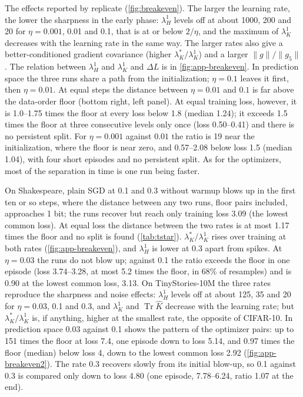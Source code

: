 \documentclass[10pt]{article}
\makeatletter
\renewcommand\paragraph{\@startsection{paragraph}{4}{\z@}{1.2ex \@plus .4ex \@minus .2ex}{-1em}{\normalfont\normalsize\bfseries}}
\newcommand{\extra}{\textsuperscript{\dag}}  %
\makeatother
\begin{document}
\paragraph{CIFAR-10.} The effects reported by \citet{jastrzebski2020breakeven} replicate
(\cref{fig:breakeven}). The larger the learning rate, the lower the sharpness in the early phase:
$\lambda_H^1$ levels off at about 1000, 200 and 20 for $\eta=0.001$, 0.01 and 0.1, that is at or below $2/\eta$,
and the maximum of $\lambda_K^1$ decreases with the learning rate in the same way. The larger rates also give a better-conditioned gradient covariance
(higher $\lambda_K^\ast/\lambda_K^1$) and a larger $\|g\|/\|g_5\|$. The relation between $\lambda_H^1$ and
$\lambda_K^1$ and $\Delta L$ is in \cref{fig:app-breakeven}. In prediction space the three runs share a path
from the initialization; $\eta=0.1$ leaves it first, then $\eta=0.01$. At equal steps the distance between
$\eta=0.01$ and $0.1$ is far above the data-order floor (bottom right, left panel). At equal training loss,
however, it is 1.0--1.75 times the floor at every loss below 1.8 (median 1.24); it exceeds 1.5 times the floor
at three consecutive levels only once (loss 0.50--0.41) and there is no persistent split. For $\eta=0.001$
against $0.01$ the ratio is 19 near the initialization, where the floor is near zero, and 0.57--2.08 below loss
1.5 (median 1.04), with four short episodes and no persistent split. As for the optimizers, most of the
separation in time is one run being faster.

\paragraph{Language models.\extra} On Shakespeare, plain SGD at 0.1 and 0.3 without warmup blows up in the first
ten or so steps, where the distance between any two runs, floor pairs included, approaches 1 bit; the runs
recover but reach only training loss 3.09 (the lowest common loss). At equal loss the distance between the two
rates is at most 1.17 times the floor and no split is found (\cref{tab:tstar}).
$\lambda_K^\ast/\lambda_K^1$ rises over training at both rates (\cref{fig:app-breakeven}), and $\lambda_H^1$ is lower at 0.3 apart from
spikes. At $\eta=0.03$ the runs do not blow up; against 0.1 the ratio exceeds the floor in one episode (loss
3.74--3.28, at most 5.2 times the floor, in 68\% of resamples) and is 0.90 at the lowest common loss, 3.13. On
TinyStories-10M the three rates reproduce the sharpness and noise effects: $\lambda_H^1$ levels off at about 125,
35 and 20 for $\eta=0.03$, 0.1 and 0.3, and $\lambda_K^1$ and $\operatorname{Tr}\hat K$ decrease with the
learning rate; but $\lambda_K^\ast/\lambda_K^1$ is, if anything, higher at the smallest rate, the opposite of
CIFAR-10. In prediction space 0.03 against 0.1 shows the pattern of the optimizer pairs: up to 151 times the
floor at loss 7.4, one episode down to loss 5.14, and 0.97 times the floor (median) below loss 4, down to the
lowest common loss 2.92 (\cref{fig:app-breakeven2}). The rate 0.3 recovers slowly from its initial blow-up, so
0.1 against 0.3 is compared only down to loss 4.80 (one episode, 7.78--6.24, ratio 1.07 at the end).
\end{document}
